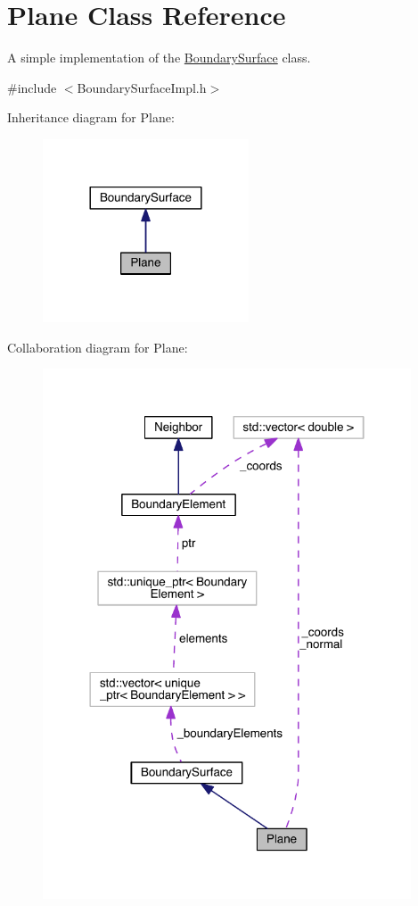 \hypertarget{classPlane}{\section{Plane Class Reference}
\label{classPlane}
}


A simple implementation of the \hyperlink{classBoundarySurface}{Boundary\+Surface} class.  




{\ttfamily \#include $<$Boundary\+Surface\+Impl.\+h$>$}



Inheritance diagram for Plane\+:\nopagebreak
\begin{figure}[H]
\begin{center}
\leavevmode
\includegraphics[width=173pt]{classPlane__inherit__graph}
\end{center}
\end{figure}


Collaboration diagram for Plane\+:
\nopagebreak
\begin{figure}[H]
\begin{center}
\leavevmode
\includegraphics[width=310pt]{classPlane__coll__graph}
\end{center}
\end{figure}
